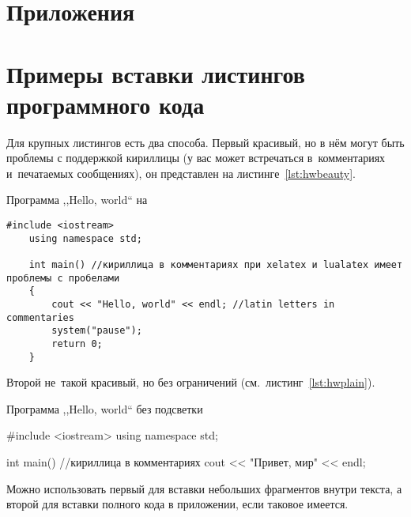 \chapter{Приложения}
\label{ch:ch5}


\chapter{Примеры вставки листингов программного кода}\label{app:A}

Для крупных листингов есть два способа. Первый красивый, но в нём могут быть
проблемы с поддержкой кириллицы (у вас может встречаться в~комментариях
и~печатаемых сообщениях), он представлен на листинге~\cref{lst:hwbeauty}.
\begin{ListingEnv}[!h]%
    \captiondelim{ } %
    \caption{Программа ,,Hello, world`` на \protect\cpp}\label{lst:hwbeauty}
    \begin{lstlisting}[language={[ISO]C++}]
	#include <iostream>
	using namespace std;

	int main() //кириллица в комментариях при xelatex и lualatex имеет проблемы с пробелами
	{
		cout << "Hello, world" << endl; //latin letters in commentaries
		system("pause");
		return 0;
	}
    \end{lstlisting}
\end{ListingEnv}%
Второй не~такой красивый, но без ограничений (см.~листинг~\cref{lst:hwplain}).
\begin{ListingEnv}[!h]
    \captiondelim{ } %
    \caption{Программа ,,Hello, world`` без подсветки}\label{lst:hwplain}
    \begin{Verb}

        #include <iostream>
        using namespace std;

        int main() //кириллица в комментариях
        {
            cout << "Привет, мир" << endl;
        }
    \end{Verb}
\end{ListingEnv}

Можно использовать первый для вставки небольших фрагментов
внутри текста, а второй для вставки полного
кода в приложении, если таковое имеется.

